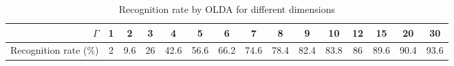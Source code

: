 \begin{table}[htbp]
  \centering
  \caption{Recognition rate by OLDA for different dimensions}
    \tabcolsep=0.11cm
    \begin{tabular}{|r|c|c|c|c|c|c|c|c|c|c|c|c|c|c|}
    \hline
        $\Gamma$  & 1     & 2     & 3     & 4     & 5     & 6     & 7     & 8     & 9     & 10    & 12    & 15    & 20    & 30 \\
    \hline
    Recognition rate (\%) & {2} & {9.6} & {26} & {42.6} & {56.6} & {66.2} & {74.6} & {78.4} & {82.4} & {83.8} & {86} & {89.6} & {90.4} & {93.6} \\
	\hline
    \end{tabular}%
  \label{tab:experiment:gamma}%
\end{table}%
